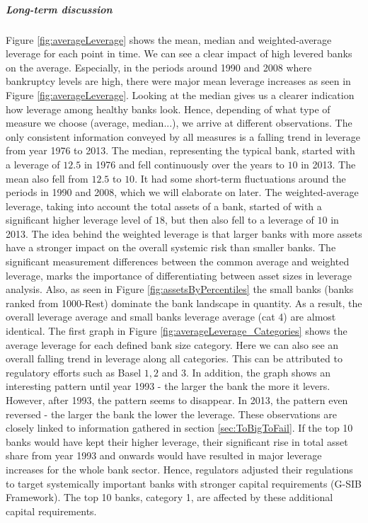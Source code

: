 \documentclass[12pt, a4paper]{article} %
\begin{document}
\subparagraph{Long-term discussion} 

Figure \ref{fig:averageLeverage} shows the mean, median and weighted-average leverage for each point in time. We can see a clear impact of high levered banks on the average. Especially, in the periods around 1990 and 2008 where bankruptcy levels are high, there were major mean leverage increases as seen in Figure \ref{fig:averageLeverage}. Looking at the median gives us a clearer indication how leverage among healthy banks look. Hence, depending of what type of measure we choose (average, median...), we arrive at different observations. The only consistent information conveyed by all measures is a falling trend in leverage from year 1976 to 2013. The median, representing the typical bank, started with a leverage of $12.5$ in 1976 and fell continuously over the years to $10$ in 2013. The mean also fell from $12.5$ to $10$. It had some short-term fluctuations around the periods in 1990 and 2008, which we will elaborate on later. The weighted-average leverage, taking into account the total assets of a bank, started of with a significant higher leverage level of $18$, but then also fell to a leverage of $10$ in 2013. The idea behind the weighted leverage is that larger banks with more assets have a stronger impact on the overall systemic risk than smaller banks. The significant measurement differences between the common average and weighted leverage, marks the importance of differentiating between asset sizes in leverage analysis. Also, as seen in Figure \ref{fig:assetsByPercentiles} the small banks (banks ranked from 1000-Rest) dominate the bank landscape in quantity. As a result, the overall leverage average and small banks leverage average (cat 4) are almost identical. 
The first graph in Figure \ref{fig:averageLeverage_Categories} shows the average leverage for each defined bank size category. Here we can also see an overall falling trend in leverage along all categories. This can be attributed to regulatory efforts such as Basel $1,2$ and $3$. In addition, the graph shows an interesting pattern until year 1993 - the larger the bank the more it levers. However, after 1993, the pattern seems to disappear. In 2013, the pattern even reversed - the larger the bank the lower the leverage. These observations are closely linked to information gathered in section \ref{sec:ToBigToFail}. If the top 10 banks would have kept their higher leverage, their significant rise in total asset share from year 1993 and onwards would have resulted in major leverage increases for the whole bank sector. Hence, regulators adjusted their regulations to target systemically important banks with stronger capital requirements (G-SIB Framework). The top 10 banks, category 1, are affected by these additional capital requirements.
\end{document}
